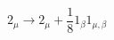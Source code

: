 \begin{equation}
2_{\mu} \rightarrow 2_{\mu} + \frac{1}{8} 1_{\beta} 1_{\mu , \beta}
\end{equation}

